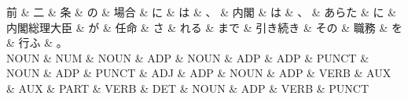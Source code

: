 \documentclass[tikz,border=5pt]{standalone}
\begin{document}
\normalsize
\begin{dependency}[edge unit distance=12.0pt]
    \begin{deptext}[column sep=1em]
        前 \& 二 \& 条 \& の \& 場合 \& に \& は \& 、 \& 内閣 \& は \& 、 \& あらた \& に \& 内閣総理大臣 \& が \& 任命 \& さ \& れる \& まで \& 引き続き \& その \& 職務 \& を \& 行ふ \& 。\\
        NOUN \& NUM \& NOUN \& ADP \& NOUN \& ADP \& ADP \& PUNCT \& NOUN \& ADP \& PUNCT \& ADJ \& ADP \& NOUN \& ADP \& VERB \& AUX \& AUX \& PART \& VERB \& DET \& NOUN \& ADP \& VERB \& PUNCT\\
    \end{deptext}
\end{dependency}
\end{document}
